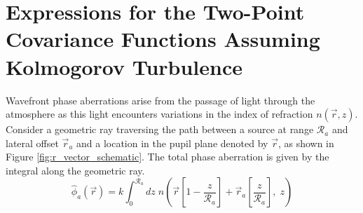 \appendix
\renewcommand{\thesection}{\Alph{section}}

\section{Expressions for the Two-Point Covariance Functions Assuming Kolmogorov Turbulence}
\label{app:kolmogorov_deriv}

Wavefront phase aberrations arise from the passage of light through
the atmosphere as this light encounters variations in the index of
refraction $n\left(\vec{r},z\right)$.  Consider a geometric ray
traversing the path between a source at range $\mathcal{R}_{a}$ and
lateral offset $\vec{r}_{a}$ and a location in the pupil plane
denoted by $\vec{r}$, as shown in Figure
\ref{fig:r_vector_schematic}.  The total phase aberration is given by the integral
along the geometric ray.
\begin{equation}\label{eqn:totalphase_n}
\hat{\phi}_{a}\left(\vec{r}\right) = k \int_{0}^{\mathcal{R}_{a}} dz \; 
n\left(\vec{r} \left[ 1 - \frac{z}{\mathcal{R}_{a}} \right] + \vec{r}_{a} 
\left[ \frac{z}{\mathcal{R}_{a}} \right], \;z\right)
\end{equation}

